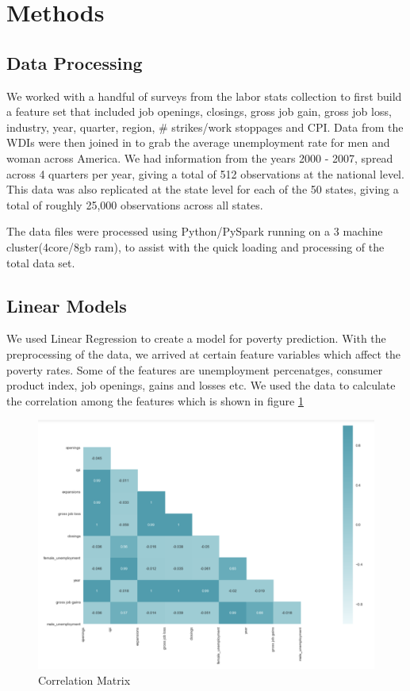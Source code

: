 \documentclass[11pt,letterpaper]{article}
\begin{document}
\section{Methods}

\subsection{Data Processing}
\label{ssec:dataproc}

We worked with a handful of surveys from the labor stats collection to first build a feature set that included job openings, closings, gross job gain, gross job loss, industry, year, quarter, region, \# strikes/work stoppages and CPI. Data from the WDIs were then joined in to grab the average unemployment rate for men and woman across America. We had information from the years 2000 - 2007, spread across 4 quarters per year, giving a total of 512 observations at the national level. This data was also replicated at the state level for each of the 50 states, giving a total of roughly 25,000 observations across all states.

The data files were processed using Python/PySpark running on a 3 machine cluster(4core/8gb ram), to assist with the quick loading and processing of the total data set. 

\subsection{Linear Models}
\label{ssec:lm}

We used Linear Regression to create a model for poverty prediction. With the preprocessing of the data, we arrived at certain feature variables which affect the poverty rates. Some of the features are unemployment percenatges, consumer product index, job openings, gains and losses etc. We used the data to calculate the correlation among the features which is shown in figure \ref{fig:Correlation Matrix}

\begin{figure}
\centering
\includegraphics[width=\linewidth]{"./pictures/Correlation_Matrix"}
\caption{Correlation Matrix}
\label{fig:Correlation Matrix}
\end{figure}
\end{document}
